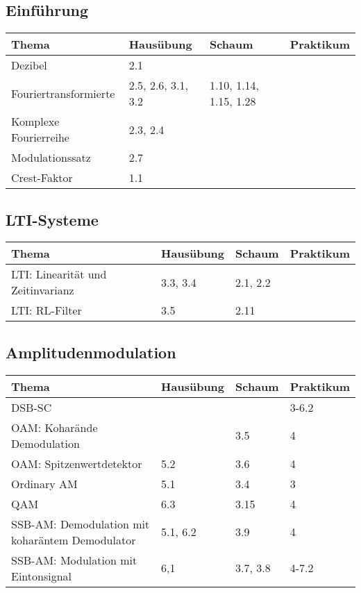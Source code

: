 \subsection{Einführung}
	\begin{tabular}{|p{9cm}|p{2.5cm}|p{3.5cm}|p{2cm}|}
	\hline
	\textbf{Thema} & \textbf{Hausübung} & \textbf{Schaum} & \textbf{Praktikum} \\ \hline
	Dezibel & 2.1 &  &  \\ \hline
	Fouriertransformierte & 2.5, 2.6, 3.1, 3.2  & 1.10, 1.14, 1.15, 1.28 &  \\
	\hline Komplexe Fourierreihe & 2.3, 2.4 & & \\ \hline
	Modulationssatz & 2.7 & & \\ \hline
	Crest-Faktor & 1.1 & & \\ \hline
	\end{tabular}

\subsection{LTI-Systeme}
	\begin{tabular}{|p{9cm}|p{2.5cm}|p{3.5cm}|p{2cm}|}
	\hline
	\textbf{Thema} & \textbf{Hausübung} & \textbf{Schaum} & \textbf{Praktikum} \\ \hline
	LTI: Linearität und Zeitinvarianz & 3.3, 3.4 & 2.1, 2.2 &  \\ \hline
	LTI: RL-Filter & 3.5 & 2.11 &  \\ \hline
	\end{tabular}

\subsection{Amplitudenmodulation}
	\begin{tabular}{|p{9cm}|p{2.5cm}|p{3.5cm}|p{2cm}|}
	\hline
	\textbf{Thema} & \textbf{Hausübung} & \textbf{Schaum} & \textbf{Praktikum} \\ \hline
	DSB-SC &  &  & 3-6.2 \\ \hline
	OAM: Koharände Demodulation & & 3.5 & 4 \\ \hline
	OAM: Spitzenwertdetektor & 5.2 & 3.6 & 4 \\ \hline
	Ordinary AM & 5.1 & 3.4 & 3 \\ \hline
	QAM & 6.3  & 3.15 & 4 \\ \hline
	SSB-AM: Demodulation mit koharäntem Demodulator & 5.1, 6.2 & 3.9 & 4 \\
	\hline SSB-AM: Modulation mit Eintonsignal & 6,1 & 3.7, 3.8 & 4-7.2 \\ \hline
	\end{tabular}

